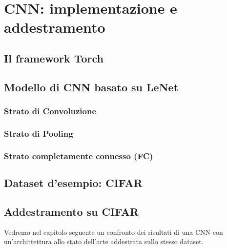 
\chapter{CNN: implementazione e addestramento} %

\label{Capitolo3} %


\section{Il framework Torch}






\section{Modello di CNN basato su LeNet}

\subsection{Strato di Convoluzione}

\subsection{Strato di Pooling}

\subsection{Strato completamente connesso (FC)}



\section{Dataset d'esempio: CIFAR}

\section{Addestramento su CIFAR}


Vedremo nel capitolo seguente un confronto dei risultati di una CNN con un'archittettura allo stato dell'arte addestrata sullo stesso dataset. 


